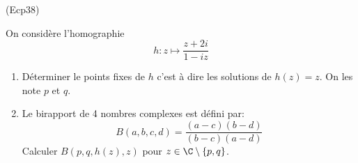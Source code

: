 \begin{tiny}(Ecp38)\end{tiny} On considère l'homographie
\begin{displaymath}
  h: z\mapsto \frac{z+2i}{1-iz}
\end{displaymath}
\begin{enumerate}
  \item Déterminer le points fixes de $h$ c'est à dire les solutions de $h(z)=z$. On les note $p$ et $q$.
  \item Le birapport de 4 nombres complexes est défini par:
  \begin{displaymath}
    B(a,b,c,d) = \frac{(a-c)(b-d)}{(b-c)(a-d)}
  \end{displaymath}
Calculer $B(p,q,h(z),z)$ pour $z\in \C \setminus\left\lbrace p,q\right\rbrace$. 
\end{enumerate}
